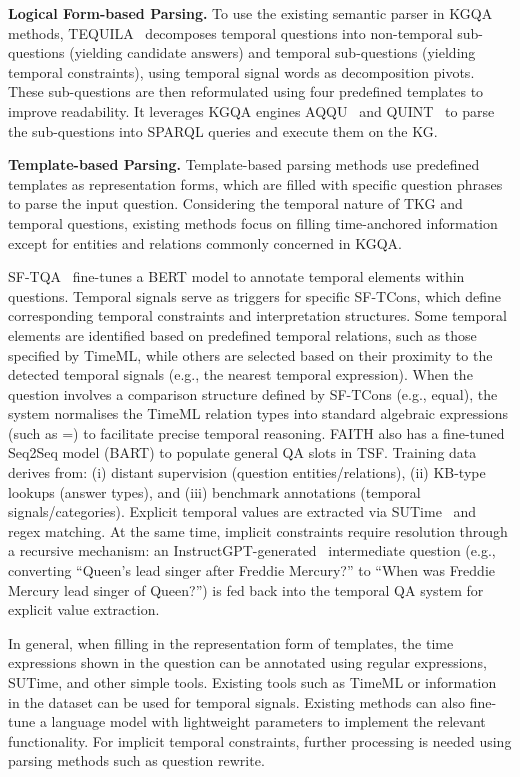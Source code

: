 {\textbf{Logical Form-based Parsing.}
To use the existing semantic parser in KGQA methods, TEQUILA~\cite{jiaTEQUILATemporalQuestion2018} decomposes temporal questions into non-temporal sub-questions (yielding candidate answers) and temporal sub-questions (yielding temporal constraints), using temporal signal words as decomposition pivots. These sub-questions are then reformulated using four predefined templates to improve readability. It leverages KGQA engines AQQU~\cite{AQQU} and QUINT~\cite{QUINT} to parse the sub-questions into SPARQL queries and execute them on the KG.

\textbf{Template-based Parsing.}
Template-based parsing methods use predefined templates as representation forms, which are filled with specific question phrases to parse the input question.  
Considering the temporal nature of TKG and temporal questions, existing methods focus on filling time-anchored information except for entities and relations commonly concerned in KGQA.

SF-TQA~\cite{dingSemanticFrameworkBased2023} fine-tunes a BERT model to annotate temporal elements within questions. Temporal signals serve as triggers for specific SF-TCons, which define corresponding temporal constraints and interpretation structures. Some temporal elements are identified based on predefined temporal relations, such as those specified by TimeML, while others are selected based on their proximity to the detected temporal signals (e.g., the nearest temporal expression).
When the question involves a comparison structure defined by SF-TCons (e.g., equal), the system normalises the TimeML relation types into standard algebraic expressions (such as =) to facilitate precise temporal reasoning.
FAITH also has a fine-tuned Seq2Seq model (BART) to populate general QA slots in TSF. Training data derives from: (i) distant supervision (question entities/relations), (ii) KB-type lookups (answer types), and (iii) benchmark annotations (temporal signals/categories). Explicit temporal values are extracted via SUTime~\cite{changSUTIMELibraryRecognizing} and regex matching. At the same time, implicit constraints require resolution through a recursive mechanism: an InstructGPT-generated~\cite{ouyangTrainingLanguageModels2022a} intermediate question (e.g., converting “Queen’s lead singer after Freddie Mercury?” to “When was Freddie Mercury lead singer of Queen?”) is fed back into the temporal QA system for explicit value extraction. 

In general, when filling in the representation form of templates, the time expressions shown in the question can be annotated using regular expressions, SUTime, and other simple tools. Existing tools such as TimeML or information in the dataset can be used for temporal signals. Existing methods can also fine-tune a language model with lightweight parameters to implement the relevant functionality. For implicit temporal constraints, further processing is needed using parsing methods such as question rewrite.

}
